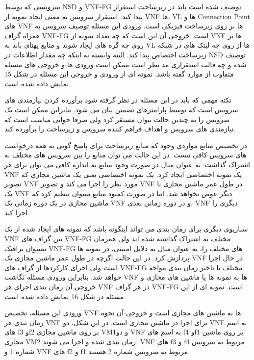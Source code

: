 
سرویسی که توسط NSD و VNF-FG توصیف شده است باید در زیرساخت استقرار پیدا کند. استقرار سرویس به معنی ایجاد نمونه از VNF ها، VL ها و Connection Point های VNF ها بر روی زیرساخت فیزیکی است. ورودی این مسئله توصیف سرویس به همراه گراف VNF-FG است. خروجی آن این است که چه تعداد نمونه از VNF ها بر روی چه گره های ایجاد شوند و منابع پهنای باند به VL ها از روی چه  لینک های در شبکه زیرساخت اختصاص پیدا کند. البته وابسته به اینکه چه مقدار اطلاعات در NSD توصیف شده و چه قالب استقراری مد نظر است ممکن است ورودی ها و خروجی های مسئله متفاوت از موارد گفته باشد. نمونه ای از ورودی و خروجی این مسئله در شکل 15 نمایش داده شده است.

نکته مهمی که باید در این مسئله در نظر گرفته شود برآورده کردن نیازمندی های سرویس است که توسط پارامترهای تضمین بیان می شود. بنابراین ممکن است یک سرویس را به چندین حالت بتوان مستقر کرد ولی صرفا جوابی مناسب است که نیازمندی های سرویس و اهداف فراهم کننده سرویس و زیرساخت را برآورده کند.


در تخصیص منابع مواردی وجود که منابع زیرساخت برای پاسخ گویی به همه درخواست های سرویس کافی نیست. در این حالت می توان منابع را بین سرویس های مختلف به اشتراک گذاشت. به عنوان مثال در صورت وجود منابع به اندازه کافی می توان برای هر VNF یک نمونه اختصاصی ایجاد کرد. یک نمونه اختصاصی یعنی یک ماشین مجازی که تصویر VNF مورد نظر را اجرا می کند و تصویر VNF در طول عمر ماشین مجازی با یک VNF دیگر عوض نخواهد شد. اما در صورت کمبود منابع میتوان تنظیم کرد که ماشین مجازی در یک دوره زمانی یک VNF و در دوره زمانی بعدی، VNF دیگری را اجرا کند.

سناریوی دیگری برای زمان بندی می تواند اینگونه باشد که نمونه های ایجاد شده از یک VNF بین گراف های VNF-FG مختلف به اشتراک گذاشته شده اند ولی همزمان نمیتوان ترافیک  VNF-FG های مختلف را، به عنوان مثال به دلایل امنیتی، در نمونه ها پردازش کرد. در این حالت اگرچه در طول عمر ماشین مجازی یک VNF در حال اجرا است ولی اجرای کارکردها از گراف های VNF-FG مختلف با تاخیر زمان بندی مواجه خواهد شد. بنابراین ورودی مسئله نگاشت VNF ها به نمونه ها یا ماشین های مجازی و خروجی آن زمان بندی اجرای هر VNF در هر گراف VNF-FG است. نمونه ای از این مسئله در شکل 16 نمایش داده شده است.

ورودی این مسئله، تخصیص VNF ها به ماشین های مجازی است و خروجی آن نحوه زمان بندی هر VNF برای اجرا در ماشین مجازی است. در این شکل، دو VNF به اسم های f3 وf2  بر روی ماشین مجازی VM1و دو VNF به اسم های f4 وf1  بر روی ماشین مجازی VM2 زمان بندی شده و اجرا می شوند. VNF های f3 و f4 مربوط به سرویس شماره 1 و VNF های f2 و f1 مربوط به سرویس شماره 2 هستند.

